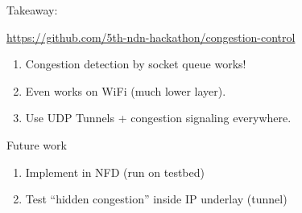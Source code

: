 \begin{frame}{Takeaway:}

{\footnotesize
\url{https://github.com/5th-ndn-hackathon/congestion-control}
}
\begin{enumerate}
\item Congestion detection by socket queue works! 
\item Even works on WiFi (much lower layer).
\item Use UDP Tunnels + congestion signaling everywhere.
\end{enumerate}

\pause
Future work
\begin{enumerate}
\item Implement in NFD (run on testbed)
\item Test ``hidden congestion'' inside IP underlay (tunnel)
\end{enumerate}


\end{frame}




